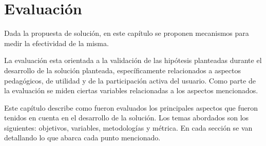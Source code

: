\chapter{Evaluación}

Dada la propuesta de solución, en este capítulo se proponen mecanismos para medir la
efectividad de la misma.

La evaluación esta orientada a la validación de las hipótesis planteadas durante
el desarrollo de la solución planteada, específicamente relacionados a aspectos
pedagógicos, de utilidad y de la participación activa del usuario. Como parte de la
evaluación se miden ciertas variables relacionadas a los aspectos mencionados.

Este capítulo describe como fueron evaluados los principales aspectos que fueron
tenidos en cuenta en el desarrollo de la solución. Los temas abordados son los siguientes:
objetivos, variables, metodologías y métrica. En cada sección se van detallando
lo que abarca cada punto mencionado.









